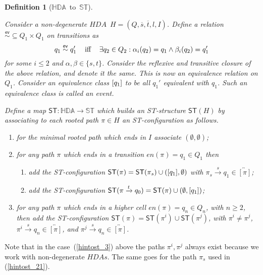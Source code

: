 \documentclass[submission,copyright,creativecommons]{eptcs}
\newtheorem{definition}[theorem]{Definition}
\newcommand{\refeq}[1]{(\ref{#1})}
\newcounter{case}
\newcommand\HDA{\ensuremath{\mathit{HDA}}}
\newcommand\HDAs{\ensuremath{\mathit{HDAs}}}
\newcommand\allST{\ensuremath{\mathbb{ST}}}
\newcommand\allHDA{\ensuremath{\mathbb{HDA}}}
\newcommand\hintost{\ensuremath{\mathsf{ST}}}
\newcommand\finishPath[1]{\ensuremath{\mathit{en}(#1)}}
\newcommand\eventEquivHDAs{\ensuremath{\stackrel{\mathsf{ev}}{\sim}}}
\newcommand{\equivClass}[2][]{\ensuremath{[#2]\ifthenelse{\equal{#1}{}}{}{_{#1}}}}
\newcommand\homotopyClass[1]{\ensuremath{\overleftrightarrow{[#1]}}}
\newcommand{\transition}[1]{\ensuremath{\xrightarrow{#1}}}
\begin{document}
\begin{definition}[\allHDA\ to\ \allST]\label{def_hdaTOst}\ 

Consider a non-degenerate \HDA\ $H=(Q,\overline{s},\overline{t},l,I)$.
Define a relation $\eventEquivHDAs\subseteq Q_{1}\times Q_{1}$ on transitions as 
\[
q_{1}\eventEquivHDAs q_{1}' \mbox{\hspace{2ex} iff \hspace{2ex}} \exists q_{2}\in Q_{2}:\alpha_{i}(q_{2})=q_{1}\wedge \beta_{i}(q_{2})=q_{1}'
\]
for some $i\leq 2$ and $\alpha,\beta\in\{s,t\}$.
Consider the reflexive and transitive closure of the above relation, and denote it the same. This is now an equivalence relation on $Q_{1}$. Consider an equivalence class $\equivClass{q_{1}}$ to be all $q_{1}'$ equivalent with $q_{1}$.
Such an equivalence class is called \emph{an event}.

Define a map $\hintost:\allHDA\rightarrow\allST$ which builds an ST-structure $\hintost(H)$ by associating to each rooted path $\pi\in H$ an ST-configuration as follows.
\begin{enumerate}
\item\label{hintost_1} for the minimal rooted path which ends in $I$ associate $(\emptyset,\emptyset)$;

\item\label{hintost_2} for any path $\pi$ which ends in a transition $\finishPath{\pi}=q_{1}\in Q_{1}$ then 
\begin{enumerate}
\item\label{hintost_21} add the ST-configuration $\hintost(\pi)=\hintost(\pi_{s})\cup(\equivClass{q_{1}},\emptyset)$ with $\pi_{s}\transition{s}q_{1}\in\homotopyClass{\pi}$;

\item\label{hintost_22} add the ST-configuration $\hintost(\pi\transition{t}q_{0})=\hintost(\pi)\cup(\emptyset,\equivClass{q_{1}})$;
\end{enumerate}

\item\label{hintost_3} for any path $\pi$ which ends in a higher cell $\finishPath{\pi}=q_{n}\in Q_{n}$, with $n\geq 2$, then add the ST-configuration $\hintost(\pi)=\hintost(\pi^{i})\cup\hintost(\pi^{j})$, with $\pi^{i}\neq\pi^{j}$, $\pi^{i}\transition{s}q_{n}\in\homotopyClass{\pi}$, and $\pi^{j}\transition{s}q_{n}\in\homotopyClass{\pi}$.
\end{enumerate}
\end{definition}

Note that in the case~\refeq{hintost_3} above the paths $\pi^{i},\pi^{j}$ always exist because we work with non-degenerate \HDAs. The same goes for the path $\pi_{s}$ used in \refeq{hintost_21}.
\end{document}
